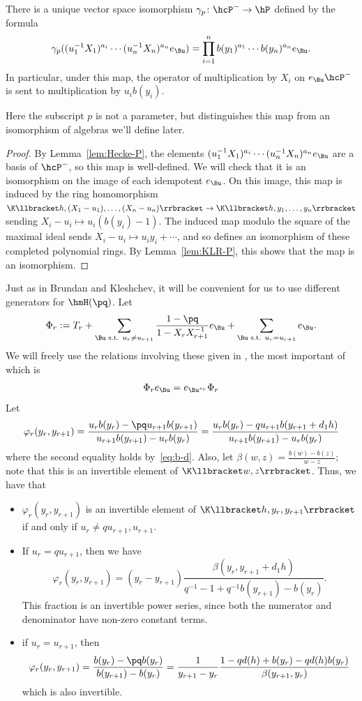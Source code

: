 \begin{lemma}\label{lem:gammap}
 There is a unique 
vector space isomorphism $\gamma_p\colon \hcP^-\to \hP$ defined by the formula
\begin{equation}
 \gamma_p((u_1^{-1}X_1)^{a_i}\cdots (u_n^{-1}X_n)^{a_n}e_{\Bu})=
\prod_{i=1}^nb(y_1)^{a_1}\cdots b(y_n)^{a_n}e_{\Bu}.\label{eq:poly-map}
\end{equation}
 In particular, under this map, the operator of multiplication by $X_i$ on
 $e_{\Bu} \hcP^-$ is sent to multiplication by $u_ib(y_i)$. 
\end{lemma}Here the subscript $p$ is not a parameter, but
 distinguishes this map from an isomorphism of algebras we'll define
 later.
 \begin{proof}
 By Lemma~\ref{lem:Hecke-P}, the elements
 $(u_1^{-1}X_1)^{a_i}\cdots (u_n^{-1}X_n)^{a_n}e_{\Bu}$ are a basis
 of $\hcP^-$, so this map is well-defined. We will check that it
 is an isomorphism on the image of each idempotent $e_{\Bu}$. On
 this image, this map is induced by the ring homomorphism
 $\K\llbracket h,(X_1-u_1),\dots, (X_n-u_n)\rrbracket \to \K\llbracket h,y_1,\dots,y_n\rrbracket $
 sending $X_i-u_i\mapsto u_i(b(y_i)-1)$. The induced map modulo
 the square of the maximal ideal sends $X_i-u_i\mapsto
 u_iy_i+\cdots$, and so defines an isomorphism of these completed
 polynomial rings.
 By Lemma~\ref{lem:KLR-P}, this shows that
 the map is an isomorphism.
 \end{proof}
 Just as in Brundan and Kleshchev, it will be convenient for us to
 use different generators for $\hmH(\pq)$. Let \[\Phi_r:=
 T_r+\sum_{\Bu\text{ s.t. }u_r\neq
 u_{r+1}}\frac{1-\pq}{1-X_rX_{r+1}^{-1}}e_{\Bu}+\sum_{\Bu\text{ s.t. }u_r=
 u_{r+1}}e_{\Bu}.
 \]
We will freely use the relations involving these given in
\cite[Lem.~4.1]{BKKL}, the most important of which is 
\begin{equation}
\Phi_r e_{\Bu}=e_{\Bu^{s_r}}\Phi_r\label{eq:Phi-e}
\end{equation}
Let \[\varphi_r(y_r,y_{r+1})=\frac{u_rb(y_r)-\pq
 u_{r+1}b(y_{r+1})}{u_{r+1}b(y_{r+1}) -u_rb(y_r)}=\frac{u_rb(y_r)-q
 u_{r+1}b(y_{r+1}+d_1h)}{u_{r+1}b(y_{r+1}) -u_rb(y_r)} \]
where the second equality holds by~\eqref{eq:b-d}. Also, let
$\beta(w,z)=\frac{b(w)-b(z)}{w-z};$ note that this is an invertible
element of $\K\llbracket w,z\rrbracket $. 
Thus, we have that 
\begin{itemize}
\item $\varphi_r(y_r,y_{r+1})$ is an invertible element of 
 $\K\llbracket h,y_r,y_{r+1}\rrbracket $ if and only if $u_r\neq qu_{r+1},u_{r+1}$. 
\item If
 $u_r= qu_{r+1}$, then we have \[\varphi_r(y_r,y_{r+1})=(y_r-y_{r+1})\frac{\beta(y_r,y_{r+1}+d_1h)}{q^{-1} -1+q^{-1}b(y_{r+1}) -b(y_r)}.\]
 This fraction is an invertible power series, since both the numerator
 and denominator have non-zero constant terms.
\item if $u_r=u_{r+1}$,
 then \[\varphi_r(y_r,y_{r+1})=\frac{b(y_r)-\pq b(y_r)}{b(y_{r+1})
 -b(y_r)}=\frac{1}{y_{r+1}
 -y_r}\frac{1-qd(h)+b(y_r)-qd(h)b(y_r)}{\beta(y_{r+1} ,y_r)}\]
 which is also invertible. 
\end{itemize}
